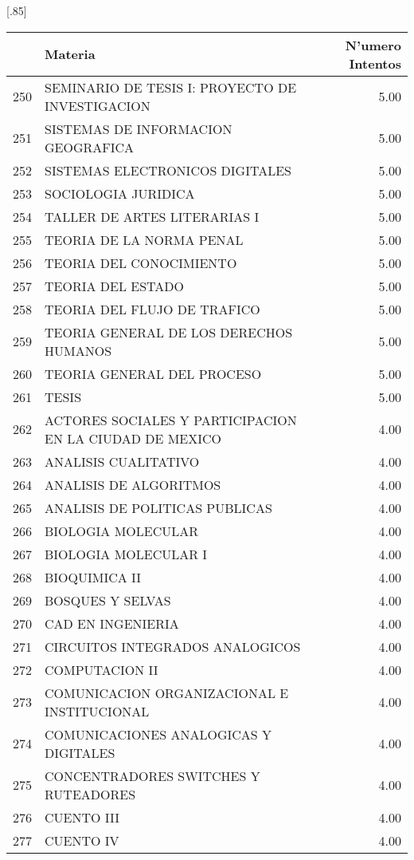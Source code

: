 \documentclass[12pt]{article}
\begin{document}
\begin{table}[ht]
\centering
\scalebox{0.75}[.85]{
\begin{tabular}{rlr}
  \hline
 & Materia & N'umero Intentos\\ 
  \hline
    250 & SEMINARIO DE TESIS I: PROYECTO DE INVESTIGACION & 5.00 \\ 
    251 & SISTEMAS DE INFORMACION GEOGRAFICA & 5.00 \\ 
  252 & SISTEMAS ELECTRONICOS DIGITALES & 5.00 \\ 
  253 & SOCIOLOGIA JURIDICA & 5.00 \\ 
  254 & TALLER DE ARTES LITERARIAS I & 5.00 \\ 
  255 & TEORIA DE LA NORMA PENAL & 5.00 \\ 
  256 & TEORIA DEL CONOCIMIENTO & 5.00 \\ 
  257 & TEORIA DEL ESTADO & 5.00 \\ 
  258 & TEORIA DEL FLUJO DE TRAFICO & 5.00 \\ 
  259 & TEORIA GENERAL DE LOS DERECHOS HUMANOS & 5.00 \\ 
  260 & TEORIA GENERAL DEL PROCESO & 5.00 \\ 
  261 & TESIS & 5.00 \\ 
  262 & ACTORES SOCIALES Y PARTICIPACION EN LA CIUDAD DE MEXICO & 4.00 \\ 
  263 & ANALISIS CUALITATIVO & 4.00 \\ 
  264 & ANALISIS DE ALGORITMOS & 4.00 \\ 
  265 & ANALISIS DE POLITICAS PUBLICAS & 4.00 \\ 
  266 & BIOLOGIA MOLECULAR & 4.00 \\ 
  267 & BIOLOGIA MOLECULAR I & 4.00 \\ 
  268 & BIOQUIMICA II & 4.00 \\ 
  269 & BOSQUES Y SELVAS & 4.00 \\ 
  270 & CAD EN INGENIERIA & 4.00 \\ 
  271 & CIRCUITOS INTEGRADOS ANALOGICOS & 4.00 \\ 
  272 & COMPUTACION II & 4.00 \\ 
  273 & COMUNICACION ORGANIZACIONAL E INSTITUCIONAL & 4.00 \\ 
  274 & COMUNICACIONES ANALOGICAS Y DIGITALES & 4.00 \\ 
  275 & CONCENTRADORES SWITCHES Y RUTEADORES & 4.00 \\ 
  276 & CUENTO III & 4.00 \\ 
  277 & CUENTO IV & 4.00 \\ 

\end{tabular}}
\end{table}
\end{document}
